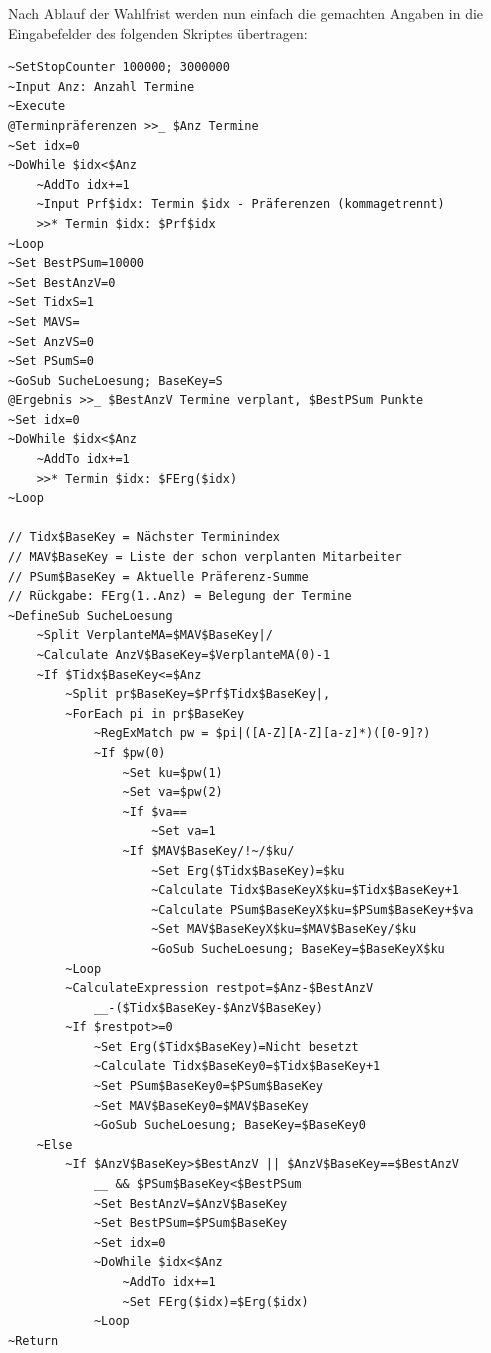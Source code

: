 Nach Ablauf der Wahlfrist werden nun einfach die gemachten Angaben in die Eingabefelder des folgenden Skriptes übertragen:

\label{BspTerminplaner}
\begin{verbatim}
~SetStopCounter 100000; 3000000
~Input Anz: Anzahl Termine
~Execute
@Terminpräferenzen >>_ $Anz Termine
~Set idx=0
~DoWhile $idx<$Anz
    ~AddTo idx+=1
    ~Input Prf$idx: Termin $idx - Präferenzen (kommagetrennt)
    >>* Termin $idx: $Prf$idx    
~Loop
~Set BestPSum=10000
~Set BestAnzV=0
~Set TidxS=1
~Set MAVS=
~Set AnzVS=0
~Set PSumS=0
~GoSub SucheLoesung; BaseKey=S
@Ergebnis >>_ $BestAnzV Termine verplant, $BestPSum Punkte
~Set idx=0
~DoWhile $idx<$Anz
    ~AddTo idx+=1
    >>* Termin $idx: $FErg($idx)
~Loop

// Tidx$BaseKey = Nächster Terminindex
// MAV$BaseKey = Liste der schon verplanten Mitarbeiter
// PSum$BaseKey = Aktuelle Präferenz-Summe
// Rückgabe: FErg(1..Anz) = Belegung der Termine
~DefineSub SucheLoesung    
    ~Split VerplanteMA=$MAV$BaseKey|/
    ~Calculate AnzV$BaseKey=$VerplanteMA(0)-1
    ~If $Tidx$BaseKey<=$Anz
        ~Split pr$BaseKey=$Prf$Tidx$BaseKey|,        
        ~ForEach pi in pr$BaseKey
            ~RegExMatch pw = $pi|([A-Z][A-Z][a-z]*)([0-9]?)
            ~If $pw(0)
                ~Set ku=$pw(1)
                ~Set va=$pw(2)
                ~If $va==
                    ~Set va=1
                ~If $MAV$BaseKey/!~/$ku/
                    ~Set Erg($Tidx$BaseKey)=$ku                    
                    ~Calculate Tidx$BaseKeyX$ku=$Tidx$BaseKey+1
                    ~Calculate PSum$BaseKeyX$ku=$PSum$BaseKey+$va
                    ~Set MAV$BaseKeyX$ku=$MAV$BaseKey/$ku
                    ~GoSub SucheLoesung; BaseKey=$BaseKeyX$ku
        ~Loop
        ~CalculateExpression restpot=$Anz-$BestAnzV
            __-($Tidx$BaseKey-$AnzV$BaseKey)
        ~If $restpot>=0
            ~Set Erg($Tidx$BaseKey)=Nicht besetzt
            ~Calculate Tidx$BaseKey0=$Tidx$BaseKey+1
            ~Set PSum$BaseKey0=$PSum$BaseKey
            ~Set MAV$BaseKey0=$MAV$BaseKey
            ~GoSub SucheLoesung; BaseKey=$BaseKey0        
    ~Else
        ~If $AnzV$BaseKey>$BestAnzV || $AnzV$BaseKey==$BestAnzV
            __ && $PSum$BaseKey<$BestPSum            
            ~Set BestAnzV=$AnzV$BaseKey
            ~Set BestPSum=$PSum$BaseKey    
            ~Set idx=0
            ~DoWhile $idx<$Anz
                ~AddTo idx+=1
                ~Set FErg($idx)=$Erg($idx)
            ~Loop        
~Return
\end{verbatim}

